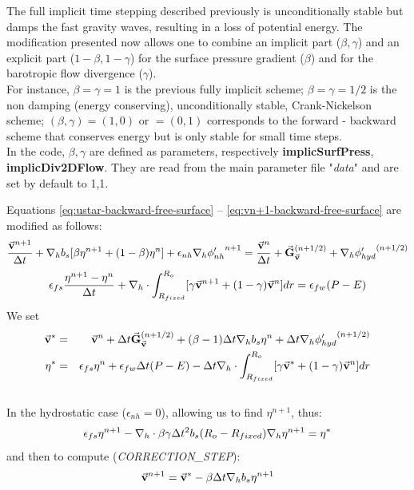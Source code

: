 The full implicit time stepping described previously is
unconditionally stable but damps the fast gravity waves, resulting in
a loss of potential energy.  The modification presented now allows one
to combine an implicit part ($\beta,\gamma$) and an explicit part
($1-\beta,1-\gamma$) for the surface pressure gradient ($\beta$) and
for the barotropic flow divergence ($\gamma$).
\\
For instance, $\beta=\gamma=1$ is the previous fully implicit scheme;
$\beta=\gamma=1/2$ is the non damping (energy conserving), unconditionally
stable, Crank-Nickelson scheme; $(\beta,\gamma)=(1,0)$ or $=(0,1)$
corresponds to the forward - backward scheme that conserves energy but is
only stable for small time steps.\\
In the code, $\beta,\gamma$ are defined as parameters, respectively 
{\bf implicSurfPress}, {\bf implicDiv2DFlow}. They are read from
the main parameter file "{\em data}" and are set by default to 1,1.

Equations \ref{eq:ustar-backward-free-surface} --
\ref{eq:vn+1-backward-free-surface} are modified as follows:
\begin{eqnarray*}
\frac{ \vec{\bf v}^{n+1} }{ \Delta t }
+ {\bf \nabla}_h b_s [ \beta {\eta}^{n+1} + (1-\beta) {\eta}^{n} ] 
+ \epsilon_{nh} {\bf \nabla}_h {\phi'_{nh}}^{n+1}
 = \frac{ \vec{\bf v}^{n} }{ \Delta t }
 + \vec{\bf G}_{\vec{\bf v}} ^{(n+1/2)}
 + {\bf \nabla}_h {\phi'_{hyd}}^{(n+1/2)}
\end{eqnarray*}
\begin{eqnarray}
\epsilon_{fs} \frac{ {\eta}^{n+1} - {\eta}^{n} }{ \Delta t}
+ {\bf \nabla}_h \cdot \int_{R_{fixed}}^{R_o} 
[ \gamma \vec{\bf v}^{n+1} + (1-\gamma) \vec{\bf v}^{n}] dr
= \epsilon_{fw} (P-E)
\label{eq:eta-n+1-CrankNick}
\end{eqnarray}
We set
\begin{eqnarray*}
\vec{\bf v}^* & = &
\vec{\bf v} ^{n} + \Delta t \vec{\bf G}_{\vec{\bf v}} ^{(n+1/2)}
+ (\beta-1) \Delta t {\bf \nabla}_h b_s {\eta}^{n}
+ \Delta t {\bf \nabla}_h {\phi'_{hyd}}^{(n+1/2)}
\\
{\eta}^* & = &
\epsilon_{fs} {\eta}^{n} + \epsilon_{fw} \Delta t (P-E) 
- \Delta t {\bf \nabla}_h \cdot \int_{R_{fixed}}^{R_o} 
[ \gamma \vec{\bf v}^* + (1-\gamma) \vec{\bf v}^{n}] dr
\end{eqnarray*}
\\
In the hydrostatic case ($\epsilon_{nh}=0$), allowing us to find
${\eta}^{n+1}$, thus:
$$
\epsilon_{fs} {\eta}^{n+1} -
{\bf \nabla}_h \cdot \beta\gamma \Delta t^2 b_s (R_o - R_{fixed})
{\bf \nabla}_h {\eta}^{n+1}
= {\eta}^*
$$ 
and then to compute ({\em CORRECTION\_STEP}):
$$
\vec{\bf v}^{n+1} = \vec{\bf v}^{*}
- \beta \Delta t {\bf \nabla}_h b_s {\eta}^{n+1}
$$


